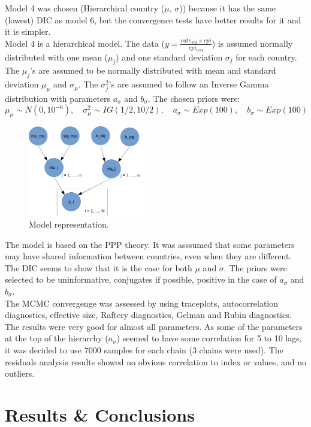 \documentclass[a4paper,12pt]{article}
\begin{document}
Model 4 was chosen (Hierarchical country ($\mu$, $\sigma$)) because it has the same (lowest) DIC as model 6, but the convergence tests have better results for it and it is simpler.\\
Model 4 is a hierarchical model. The data ($y = \frac{rate_{std} \times cpi}{cpi_{usa}}$) is assumed normally distributed with one mean ($\mu_j$) and one standard deviation $\sigma_j$ for each country. The $\mu_j$'s are assumed to be normally distributed with mean and standard deviation $\mu_{\mu}$ and $\sigma_{\mu}$. The $\sigma_j^2$'s are assumed to follow an Inverse Gamma distribution with parameters $a_{\sigma}$ and $b_{\sigma}$. The chosen priors were:
$$
\mu_{\mu} \sim N(0, 10^{-6}) , \quad
\sigma_{\mu}^2 \sim IG(1/2, 10/2) , \quad
a_{\sigma} \sim Exp(100) , \quad
b_{\sigma} \sim Exp(100)
$$

\begin{figure}[!h]
\centering
\includegraphics[width=2.0in]{images/i007_hierarchical.png}
\caption{Model representation.}
\label{fig_raw_data}
\end{figure}
The model is based on the PPP theory. It was asssumed that some parameters may have shared information between countries, even when they are different. The DIC seems to show that it is the case for both $\mu$ and $\sigma$. The priors were selected to be uninformative, conjugates if possible, positive in the case of $a_{\sigma}$ and $b_{\sigma}$.\\
The MCMC convergenge was assessed by using traceplots, autocorrelation diagnostics, effective size, Raftery diagnostics, Gelman and Rubin diagnostics. The results were very good for almost all parameters. As some of the parameters at the top of the hierarchy ($a_{\sigma}$) seemed to have some correlation for 5 to 10 lags, it was decided to use $7000$ samples for each chain (3 chains were used). The residuals analysis results showed no obvious correlation to index or values, and no outliers.

\section{Results \& Conclusions}
\end{document}
